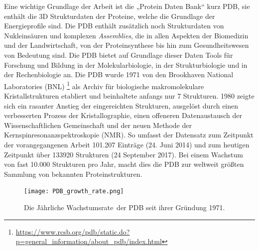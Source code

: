 Eine wichtige Grundlage der Arbeit ist die „Protein Daten Bank“ kurz PDB\cite{Bernstein.1977}, sie enthält die 3D Strukturdaten der Proteine, welche die Grundlage der Energieprofile sind. Die PDB enthält zusätzlich noch Strukturdaten von Nukleinsäuren und komplexen \emph{Assemblies}, die in allen Aspekten der Biomedizin und der Landwirtschaft, von der Proteinsynthese bis hin zum Gesundheitswesen von Bedeutung sind. Die PDB bietet auf Grundlage dieser Daten Tools für Forschung und Bildung in der Molekularbiologie, in der Strukturbiologie und in der Rechenbiologie an.
Die PDB wurde 1971 von den Brookhaven National Laboratories (BNL) \footnote{\url{https://www.rcsb.org/pdb/static.do?p=general_information/about_pdb/index.html}} als Archiv für biologische makromolekulare Kristallstrukturen etabliert und beinhaltete anfangs nur 7 Strukturen. 1980 zeigte sich ein rasanter Anstieg der eingereichten Strukturen, ausgelöst durch einen verbesserten Prozess der Kristallographie, einen offeneren Datenaustausch der Wissenschaftlichen Gemeinschaft und der neuen Methode der Kernspinresonanzspektroskopie (NMR). So umfasst der Datensatz zum Zeitpunkt der vorangegangenen Arbeit 101.207 Einträge (24. Juni 2014) und zum heutigen Zeitpunkt über 133920 Strukturen (24 September 2017). Bei einem Wachstum von fast 10.000 Strukturen pro Jahr, macht dies die PDB zur weltweit größten Sammlung von bekannten Proteinstrukturen.

\begin{figure}
\texttt{[image: PDB\_growth\_rate.png]}
\caption[Caption for LOF]{Die Jährliche Wachstumsrate\protect\footnotemark \ der PDB seit ihrer Gründung 1971.}
\label{fig:PDB_growth_rate}
\end{figure}


